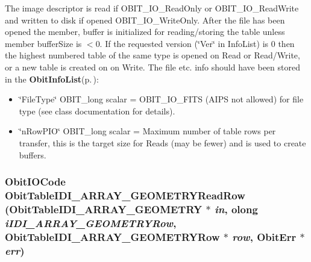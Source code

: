 The image descriptor is read if OBIT\_\-IO\_\-Read\-Only or OBIT\_\-IO\_\-Read\-Write and written to disk if opened OBIT\_\-IO\_\-Write\-Only. After the file has been opened the member, buffer is initialized for reading/storing the table unless member buffer\-Size is $<$0. If the requested version (\char`\"{}Ver\char`\"{} in Info\-List) is 0 then the highest numbered table of the same type is opened on Read or Read/Write, or a new table is created on on Write. The file etc. info should have been stored in the {\bf Obit\-Info\-List}{\rm (p.\,\pageref{structObitInfoList})}: \begin{itemize}
\item \char`\"{}File\-Type\char`\"{} OBIT\_\-long scalar = OBIT\_\-IO\_\-FITS (AIPS not allowed) for file type (see class documentation for details). \item \char`\"{}n\-Row\-PIO\char`\"{} OBIT\_\-long scalar = Maximum number of table rows per transfer, this is the target size for Reads (may be fewer) and is used to create buffers. 
\end{itemize}
\subsubsection{\setlength{\rightskip}{0pt plus 5cm}Obit\-IOCode Obit\-Table\-IDI\_\-ARRAY\_\-GEOMETRYRead\-Row ({\bf Obit\-Table\-IDI\_\-ARRAY\_\-GEOMETRY} $\ast$ {\em in}, {\bf olong} {\em i\-IDI\_\-ARRAY\_\-GEOMETRYRow}, {\bf Obit\-Table\-IDI\_\-ARRAY\_\-GEOMETRYRow} $\ast$ {\em row}, {\bf Obit\-Err} $\ast$ {\em err})}\label{ObitTableIDI__ARRAY__GEOMETRY_8c_a22}


